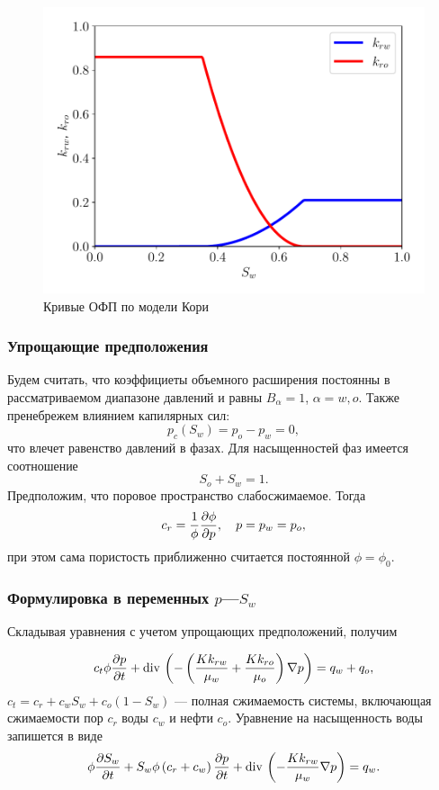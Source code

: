 \begin{figure}[H]
	\centering
	\includegraphics[width=0.7\linewidth]{img/RPP_Corey}
	\caption{Кривые ОФП по модели Кори}
	\label{fig:RPP_Corey}
\end{figure}

\subsubsection{Упрощающие предположения}
Будем считать, что коэффициеты объемного расширения постоянны в рассматриваемом диапазоне давлений и равны $B_\alpha = 1$, $\alpha = w,o$. Также пренебрежем влиянием капилярных сил:
\begin{equation}\label{eq:common_eq_capillar}
	p_c(S_w) = p_o - p_w = 0,
\end{equation}
что влечет равенство давлений в фазах.
Для насыщенностей фаз имеется соотношение
\begin{equation}\label{eq:So_Sw_1}
	S_o + S_w = 1.
\end{equation}
Предположим, что поровое пространство слабосжимаемое. Тогда
\begin{equation}\label{eq:compress_phi}
	c_r = \frac{1}{\phi} \dfrac{\partial \phi}{\partial p}, \quad p = p_w=p_o,
\end{equation}
при этом сама пористость приближенно считается постоянной $\phi=\phi_0$.

\subsubsection{Формулировка в переменных $p$---$S_w$}

Складывая уравнения с учетом упрощающих предположений, получим

\begin{equation}
    c_t\phi \dfrac{\partial p}{\partial t}
    + \operatorname{div}\, \left( -\left(\frac{K k_{rw}}{\mu_w } +
     \frac{K k_{ro}}{\mu_o}\right)\nabla p \right) = q_w + q_o,
\end{equation}
$c_t= c_r + c_w  S_w + c_o (1-S_w)$ --- полная сжимаемость системы, включающая сжимаемости пор $c_r$ воды $c_w$ и нефти $c_o$.
Уравнение на насыщенность воды запишется в виде
\begin{equation}\label{eq:star_common_equation_multiphase_satur}
	  \phi \dfrac{\partial S_w}{\partial t} + S_w\phi\left(c_r + c_w \right)\dfrac{\partial p}{\partial t} + \operatorname{div}\, \left( -\frac{K k_{rw}}{\mu_w}\nabla p \right) = 
	  q_w.
\end{equation}

